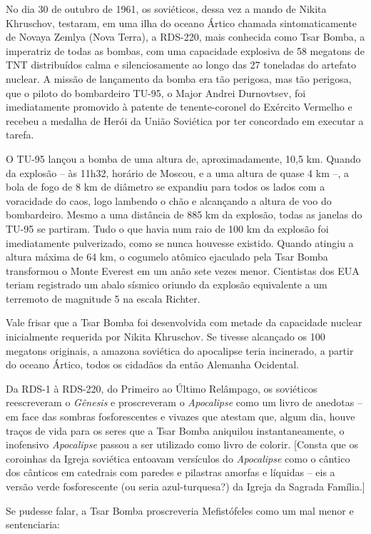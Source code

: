 No dia 30 de outubro de 1961, os soviéticos, dessa vez a mando de Nikita
Khruschov, testaram, em uma ilha do oceano Ártico chamada
sintomaticamente de Novaya Zemlya (Nova Terra), a RDS-220, mais
conhecida como Tsar Bomba, a imperatriz de todas as bombas, com uma
capacidade explosiva de 58 megatons de TNT distribuídos calma e
silenciosamente ao longo das 27 toneladas do artefato nuclear. A missão
de lançamento da bomba era tão perigosa, mas tão perigosa, que o piloto
do bombardeiro TU-95, o Major Andrei Durnovtsev, foi imediatamente
promovido à patente de tenente-coronel do Exército Vermelho e recebeu a
medalha de Herói da União Soviética por ter concordado em executar a
tarefa.

O TU-95 lançou a bomba de uma altura de, aproximadamente, 10,5 km.
Quando da explosão -- às 11h32, horário de Moscou, e a uma altura de
quase 4 km --, a bola de fogo de 8 km de diâmetro se expandiu para todos
os lados com a voracidade do caos, logo lambendo o chão e alcançando a
altura de voo do bombardeiro. Mesmo a uma distância de 885 km da
explosão, todas as janelas do TU-95 se partiram. Tudo o que havia num
raio de 100 km da explosão foi imediatamente pulverizado, como se nunca
houvesse existido. Quando atingiu a altura máxima de 64 km, o cogumelo
atômico ejaculado pela Tsar Bomba transformou o Monte Everest em um anão
sete vezes menor. Cientistas dos EUA teriam registrado um abalo sísmico
oriundo da explosão equivalente a um terremoto de magnitude 5 na escala
Richter.

Vale frisar que a Tsar Bomba foi desenvolvida com metade da capacidade
nuclear inicialmente requerida por Nikita Khruschov. Se tivesse
alcançado os 100 megatons originais, a amazona soviética do apocalipse
teria incinerado, a partir do oceano Ártico, todos os cidadãos da então
Alemanha Ocidental.

Da RDS-1 à RDS-220, do Primeiro ao Último Relâmpago, os soviéticos
reescreveram o \emph{Gênesis} e proscreveram o \emph{Apocalipse} como um
livro de anedotas -- em face das sombras fosforescentes e vivazes que
atestam que, algum dia, houve traços de vida para os seres que a Tsar
Bomba aniquilou instantaneamente, o inofensivo \emph{Apocalipse} passou
a ser utilizado como livro de colorir. {[}Consta que os coroinhas da
Igreja soviética entoavam versículos do \emph{Apocalipse} como o cântico
dos cânticos em catedrais com paredes e pilastras amorfas e líquidas --
eis a versão verde fosforescente (ou seria azul-turquesa?) da Igreja da
Sagrada Família.{]}

Se pudesse falar, a Tsar Bomba proscreveria Mefistófeles como um mal
menor e sentenciaria:

